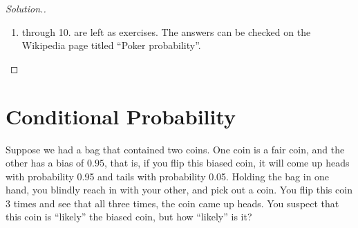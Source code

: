 \documentclass{tufte-book}
\theoremstyle{definition}
\numberwithin{theorem}{section}
\numberwithin{definition}{section}
\numberwithin{lemma}{section}
\numberwithin{corollary}{section}
\numberwithin{proposition}{section}
\numberwithin{remark}{section}
\numberwithin{claim}{section}
\numberwithin{observation}{section}
\numberwithin{fact}{section}
\numberwithin{assumption}{section}
\numberwithin{example}{section}
\numberwithin{exercise}{section}
\begin{document}
\begin{proof}[Solution.]
\begin{enumerate}
\item through 10. are left as exercises. The answers can be checked on the Wikipedia page titled ``Poker probability''.


\end{enumerate}

\end{proof}

\chapter{Conditional Probability}

Suppose we had a bag that contained two coins. One coin is a fair coin, and the other has a bias of $0.95$, that is, if you flip this biased coin, it will come up heads with probability 0.95 and tails with probability 0.05. Holding the bag in one hand, you blindly reach in with your other, and pick out a coin. You flip this coin 3 times and see that all three times, the coin came up heads. You suspect that this coin is ``likely'' the biased coin, but how ``likely'' is it?
\end{document}
